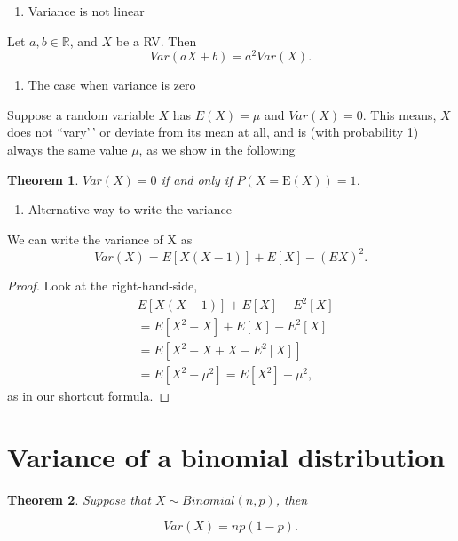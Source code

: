 \documentclass[
]{book}
\providecommand{\tightlist}{%
  \setlength{\itemsep}{0pt}\setlength{\parskip}{0pt}}
\newtheorem{theorem}{Theorem}[chapter]
\theoremstyle{definition}
\theoremstyle{definition}
\theoremstyle{definition}
\theoremstyle{definition}
\theoremstyle{remark}
\begin{document}
\begin{enumerate}
\def\labelenumi{\arabic{enumi}.}
\setcounter{enumi}{2}
\tightlist
\item
  Variance is not linear
\end{enumerate}

Let \(a,b\in \mathbb{R}\), and \(X\) be a RV. Then
\[
  Var(aX +b ) = a^2 Var(X).
\]

\begin{enumerate}
\def\labelenumi{\arabic{enumi}.}
\setcounter{enumi}{3}
\tightlist
\item
  The case when variance is zero
\end{enumerate}

Suppose a random variable \(X\) has \(E(X)=\mu\) and \(Var(X)=0\). This means, \(X\) does not ``vary'\,' or deviate from its mean at all, and is (with probability 1) always the same value \(\mu\), as we show in the following

\begin{theorem}
\(Var(X) = 0\) if and only if \(P(X = \mbox{E}(X)) = 1\).
\end{theorem}

\begin{enumerate}
\def\labelenumi{\arabic{enumi}.}
\setcounter{enumi}{4}
\tightlist
\item
  Alternative way to write the variance
\end{enumerate}

We can write the variance of X as
\[
  Var(X) = E[X(X-1)] + E[X] - (EX)^2.
\]

\begin{proof}
Look at the right-hand-side,
\begin{align*}
  &E[X(X-1)]+ E[X] - E^2[X]\\
  &=E[X^2-X] + E[X] - E^2[X]\\
  &= E[X^2 -X + X - E^2[X]] \\
  &= E[X^2 -\mu^2] = E[X^2] - \mu^2,
\end{align*}
as in our shortcut formula.
\end{proof}

\section{Variance of a binomial distribution}\label{variance-of-a-binomial-distribution}

\begin{theorem}
Suppose that \(X\sim Binomial(n,p)\), then

\[
Var(X) = np(1-p).
\]
\end{theorem}
\end{document}
